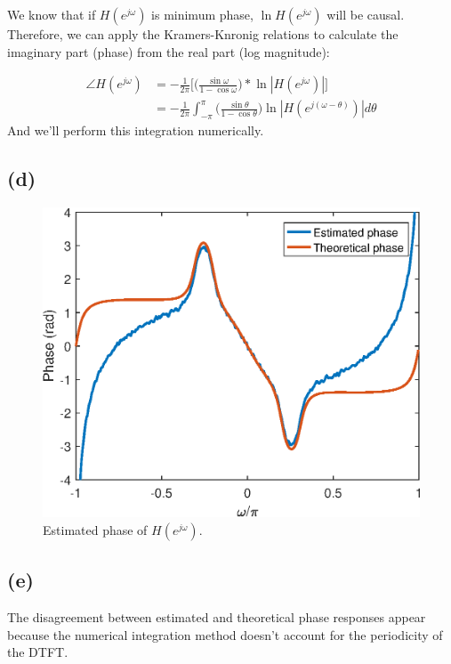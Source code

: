 \documentclass{article}
\begin{document}
We know that if $H(e^{j\omega})$ is minimum phase, $\ln H(e^{j\omega})$ will be causal. Therefore, we can apply the Kramers-Knronig relations to calculate the imaginary part (phase) from the real part (log magnitude):


\begin{align} \nonumber
\angle H(e^{j\omega}) &= -\frac{1}{2\pi}\bigg[\Big(\frac{\sin\omega}{1-\cos\omega}\Big)\ast \ln |H(e^{j\omega})|\bigg] \\
 &=-\frac{1}{2\pi}\int_{-\pi}^{\pi}\bigg(\frac{\sin\theta}{1-\cos\theta}\bigg)\ln |H(e^{j(\omega- \theta)})|d\theta
\end{align} 
And we'll perform this integration numerically.

\subsection{(d)}

\FloatBarrier
\begin{figure}[h!]
	\centering
	\includegraphics[scale=0.7]{figs/hw04_q3d_phase.eps}
	\caption{Estimated phase of $H(e^{j\omega})$.}
\end{figure}
\FloatBarrier

\subsection{(e)}

The disagreement between estimated and theoretical phase responses appear because the numerical integration method doesn't account for the periodicity of the DTFT. 
\end{document}
